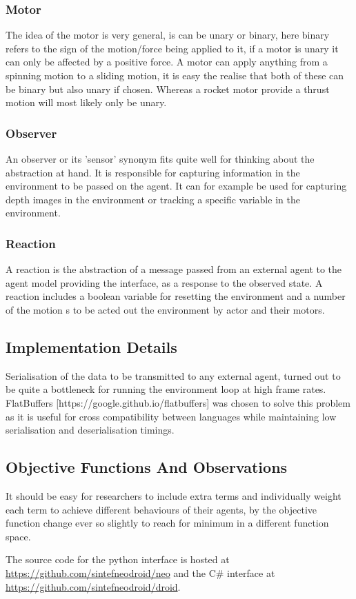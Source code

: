 \subsubsection{Motor}

The idea of the motor is very general, is can be unary or binary, here binary refers to the sign of the motion/force being applied to it, if a motor is unary it can only be affected by a positive force.
A motor can apply anything from a spinning motion to a sliding motion, it is easy the realise that both of these can be binary but also unary if chosen. Whereas a rocket motor provide a thrust motion will most likely only be unary.


\subsubsection{Observer}

An observer or its 'sensor' synonym fits quite well for thinking about the abstraction at hand. It is responsible for capturing information in the environment to be passed on the agent. It can for example be used for capturing depth images in the environment or tracking a specific variable in the environment.

\subsubsection{Reaction}

A reaction is the abstraction of a message passed from an external agent to the agent model providing the interface, as a response to the observed state. A reaction includes a boolean variable for resetting the environment and a number of the motion s to be acted out the environment by actor and their motors.

\subsection{Implementation Details}

Serialisation of the data to be transmitted to any external agent, turned out to be quite a bottleneck for running the environment loop at high frame rates. FlatBuffers [https://google.github.io/flatbuffers] was chosen to solve this problem as it is useful for cross compatibility between languages while maintaining low serialisation and deserialisation timings.

\subsection{Objective Functions And Observations}

It should be easy for researchers to include extra terms and individually weight each term to achieve different behaviours of their agents, by the objective function change ever so slightly to reach for minimum in a different function space.

%

The source code for the python interface is hosted at \url{https://github.com/sintefneodroid/neo} and the C\# interface at \url{https://github.com/sintefneodroid/droid}.